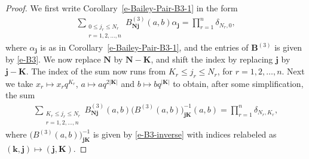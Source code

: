 \documentclass[pdftex]{sigma}
\numberwithin{equation}{section}
\newcommand\sumK{{\left| \boldsymbol{K} \right|}}
\newcommand{\B}{{ \mathbf B}}
\newcommand{\N}{{ \boldsymbol N}}
\newcommand{\K}{{ \boldsymbol K}}
\renewcommand{\k}{{ \boldsymbol{k}}}
\renewcommand{\j}{{ \boldsymbol{j}}}
\newcommand{\multsum}[3]{{\sum\limits_{\substack{{0\le #1_#3 \le #2_#3} \\
{#3 =1,2,\dots, n}}}}}
\newcommand{\smallprod}[1]{\prod\limits_{r =1}^{#1}} %
\begin{document}
\begin{proof}
We first write Corollary~\ref{e-Bailey-Pair-B3-1} in the form
 \begin{gather*}\label{n-B3-inverse-1}
 \multsum{j}{N}{r} B^{(3)}_{\N\j} (a,b) \alpha_\j = \smallprod n \delta_{N_r, 0} ,
\end{gather*}
where $\alpha_\j$ is as in Corollary~\ref{e-Bailey-Pair-B3-1}, and the entries of $\B^{(3)}$ is given by \eqref{e-B3}. We now replace $\N$ by $\N-\K$, and shift the index by replacing $\j$ by $\j-\K$. The index of the sum now runs from $K_r\leq j_r \leq N_r$, for $r=1, 2, \dots, n$. Next we take $x_r\mapsto x_rq^{K_r}$, $a\mapsto aq^{2\sumK}$ and $b\mapsto bq^{\sumK}$ to obtain, after some simplification, the sum
 \begin{gather}\label{n-B3-inverse-2}
 \sum\limits_{\substack{{K_r\le j_r \le N_r} \\
{r =1,2,\dots, n}}} B^{(3)}_{\N\j} (a,b) \big(B^{(3)}(a,b)\big)^{-1}_{\j\K}(a,b) = \smallprod n \delta_{N_r, K_r},
\end{gather}
where $\big(B^{(3)}(a,b)\big)^{-1}_{\j\K}$ is given by \eqref{e-B3-inverse} with indices relabeled as $(\k, \j)\mapsto (\j, \K)$.
\end{proof}
\end{document}
